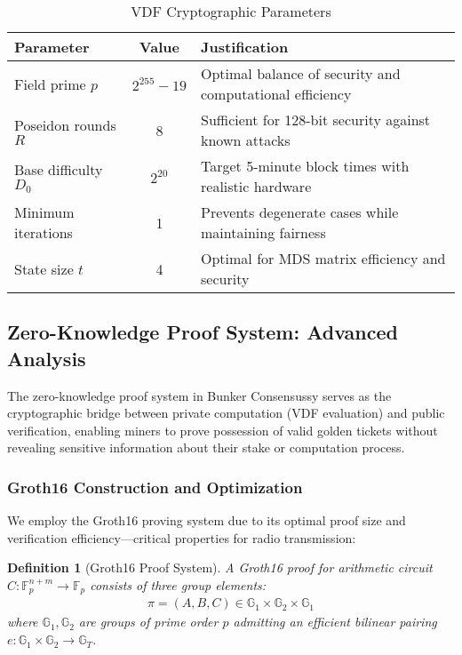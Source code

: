 \documentclass[11pt,a4paper]{article}
\newtheorem{definition}[theorem]{Definition}
\begin{document}
\begin{table}[h]
\centering
\begin{tabular}{lcp{8cm}}
\toprule
Parameter & Value & Justification \\
\midrule
Field prime $p$ & $2^{255} - 19$ & Optimal balance of security and computational efficiency \\
Poseidon rounds $R$ & 8 & Sufficient for 128-bit security against known attacks \\
Base difficulty $D_0$ & $2^{20}$ & Target 5-minute block times with realistic hardware \\
Minimum iterations & 1 & Prevents degenerate cases while maintaining fairness \\
State size $t$ & 4 & Optimal for MDS matrix efficiency and security \\
\bottomrule
\end{tabular}
\caption{VDF Cryptographic Parameters}
\end{table}

\subsection{Zero-Knowledge Proof System: Advanced Analysis}

The zero-knowledge proof system in Bunker Consensussy serves as the cryptographic bridge between private computation (VDF evaluation) and public verification, enabling miners to prove possession of valid golden tickets without revealing sensitive information about their stake or computation process.

\subsubsection{Groth16 Construction and Optimization}

We employ the Groth16 proving system due to its optimal proof size and verification efficiency—critical properties for radio transmission:

\begin{definition}[Groth16 Proof System]
A Groth16 proof for arithmetic circuit $C: \mathbb{F}_p^{n+m} \rightarrow \mathbb{F}_p$ consists of three group elements:
\begin{align}
\pi = (A, B, C) \in \mathbb{G}_1 \times \mathbb{G}_2 \times \mathbb{G}_1
\end{align}
where $\mathbb{G}_1, \mathbb{G}_2$ are groups of prime order $p$ admitting an efficient bilinear pairing $e: \mathbb{G}_1 \times \mathbb{G}_2 \rightarrow \mathbb{G}_T$.
\end{definition}
\end{document}
